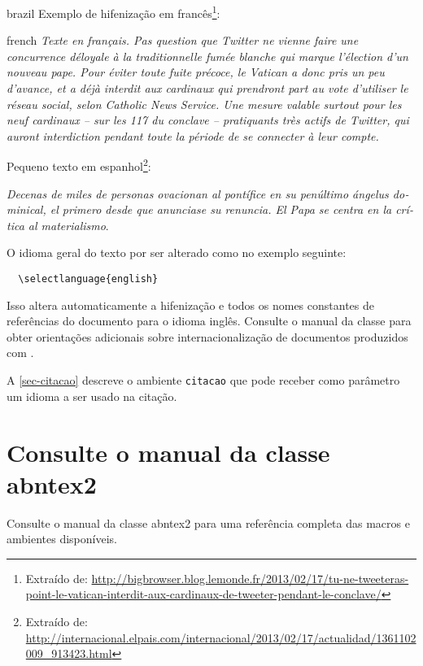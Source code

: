 \begin{otherlanguage*}{brazil}
Exemplo de hifenização em francês\footnote{Extraído de:
\url{http://bigbrowser.blog.lemonde.fr/2013/02/17/tu-ne-tweeteras-point-le-vatican-interdit-aux-cardinaux-de-tweeter-pendant-le-conclave/}}:

\begin{otherlanguage*}{french}
\textit{Texte en français. Pas question que Twitter ne vienne faire une
concurrence déloyale à la traditionnelle fumée blanche qui mar\-que l'élection
d'un nouveau pape. Pour éviter toute fuite précoce, le Vatican a donc pris un
peu d'avance, et a déjà interdit aux cardinaux qui prendront part au vote
d'utiliser le réseau social, selon Catholic News Service. Une mesure valable
surtout pour les neuf cardinaux – sur les 117 du conclave – pratiquants très
actifs de Twitter, qui auront interdiction pendant toute la période de se
connecter à leur compte.}
\end{otherlanguage*}

Pequeno texto em espanhol\footnote{Extraído de:
\url{http://internacional.elpais.com/internacional/2013/02/17/actualidad/1361102009_913423.html}}:

\foreignlanguage{spanish}{\textit{Decenas de miles de personas ovacionan al pontífice en su
penúltimo ángelus dominical, el primero desde que anunciase su renuncia. El Papa se
centra en la crítica al materialismo}}.

O idioma geral do texto por ser alterado como no exemplo seguinte:

\begin{verbatim}
  \selectlanguage{english}
\end{verbatim}

Isso altera automaticamente a hifenização e todos os nomes constantes de
referências do documento para o idioma inglês. Consulte o manual da classe
\cite{abntex2classe} para obter orientações adicionais sobre internacionalização de
documentos produzidos com \abnTeX{}.

A \autoref{sec-citacao} descreve o ambiente \texttt{citacao} que pode receber
como parâmetro um idioma a ser usado na citação.

\section{Consulte o manual da classe \textsf{abntex2}}

Consulte o manual da classe \textsf{abntex2} \cite{abntex2classe} para uma
referência completa das macros e ambientes disponíveis.


\end{otherlanguage*}
